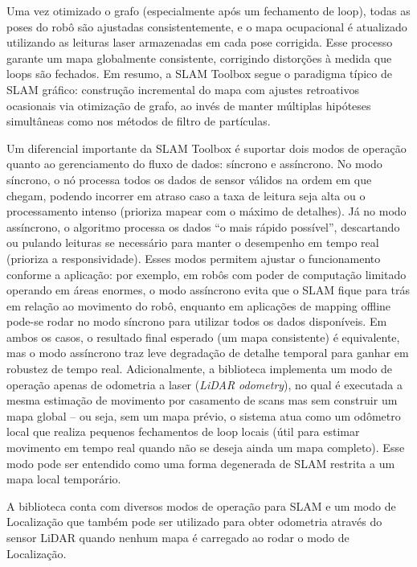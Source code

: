     Uma vez otimizado o grafo (especialmente após um fechamento de loop), todas as poses do robô são ajustadas consistentemente, e o mapa ocupacional é atualizado utilizando as leituras laser armazenadas em cada pose corrigida. Esse processo garante um mapa globalmente consistente, corrigindo distorções à medida que loops são fechados. Em resumo, a SLAM Toolbox segue o paradigma típico de SLAM gráfico: construção incremental do mapa com ajustes retroativos ocasionais via otimização de grafo, ao invés de manter múltiplas hipóteses simultâneas como nos métodos de filtro de partículas.

    Um diferencial importante da SLAM Toolbox é suportar dois modos de operação quanto ao gerenciamento do fluxo de dados: síncrono e assíncrono. No modo síncrono, o nó processa todos os dados de sensor válidos na ordem em que chegam, podendo incorrer em atraso caso a taxa de leitura seja alta ou o processamento intenso (prioriza mapear com o máximo de detalhes). Já no modo assíncrono, o algoritmo processa os dados “o mais rápido possível”, descartando ou pulando leituras se necessário para manter o desempenho em tempo real (prioriza a responsividade). Esses modos permitem ajustar o funcionamento conforme a aplicação: por exemplo, em robôs com poder de computação limitado operando em áreas enormes, o modo assíncrono evita que o SLAM fique para trás em relação ao movimento do robô, enquanto em aplicações de mapping offline pode-se rodar no modo síncrono para utilizar todos os dados disponíveis. Em ambos os casos, o resultado final esperado (um mapa consistente) é equivalente, mas o modo assíncrono traz leve degradação de detalhe temporal para ganhar em robustez de tempo real. Adicionalmente, a biblioteca implementa um modo de operação apenas de odometria a laser (\textit{LiDAR odometry}), no qual é executada a mesma estimação de movimento por casamento de scans mas sem construir um mapa global – ou seja, sem um mapa prévio, o sistema atua como um odômetro local que realiza pequenos fechamentos de loop locais (útil para estimar movimento em tempo real quando não se deseja ainda um mapa completo). Esse modo pode ser entendido como uma forma degenerada de SLAM restrita a um mapa local temporário.

    
    A biblioteca conta com diversos modos de operação para SLAM e um modo de Localização que também pode ser utilizado para obter odometria através do sensor LiDAR quando nenhum mapa é carregado ao rodar o modo de Localização. 
    
